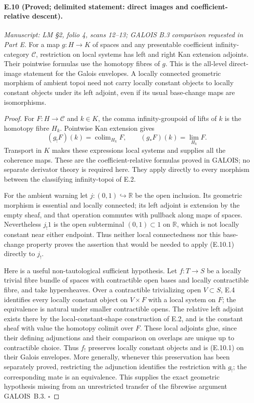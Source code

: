 \paragraph{E.10 (Proved; delimited statement: direct images and coefficient-relative descent).}
\textit{Manuscript: LM \S2, folio 4, scans 12--13; GALOIS B.3 comparison requested in Part E.}
For a map $g:H\to K$ of spaces and any presentable coefficient infinity-category $\mathcal C$, restriction on local systems has left and right Kan extension adjoints. Their pointwise formulas use the homotopy fibres of $g$. This is the all-level direct-image statement for the Galois envelopes. A locally connected geometric morphism of ambient topoi need not carry locally constant objects to locally constant objects under its left adjoint, even if its usual base-change maps are isomorphisms.
\begin{proof}
For $F:H\to\mathcal C$ and $k\in K$, the comma infinity-groupoid of lifts of $k$ is the homotopy fibre $H_k$. Pointwise Kan extension gives
\[
 (g_!F)(k)=\operatorname{colim}_{H_k}F,
 \qquad (g_*F)(k)=\lim_{H_k}F.
                                                        \tag{E.10.1}
\]
Transport in $K$ makes these expressions local systems and supplies all the coherence maps. These are the coefficient-relative formulas proved in GALOIS; no separate derivator theory is required here. They apply directly to every morphism between the classifying infinity-topoi of E.2.

For the ambient warning let $j:(0,1)\hookrightarrow\mathbb R$ be the open inclusion. Its geometric morphism is essential and locally connected; its left adjoint is extension by the empty sheaf, and that operation commutes with pullback along maps of spaces. Nevertheless $j_!1$ is the open subterminal $(0,1)\subset1$ on $\mathbb R$, which is not locally constant near either endpoint. Thus neither local connectedness nor this base-change property proves the assertion that would be needed to apply (E.10.1) directly to $j_!$.

Here is a useful non-tautological sufficient hypothesis. Let $f:T\to S$ be a locally trivial fibre bundle of spaces with contractible open bases and locally contractible fibre, and take hypersheaves. Over a contractible trivializing open $V\subset S$, E.4 identifies every locally constant object on $V\times F$ with a local system on $F$; the equivalence is natural under smaller contractible opens. The relative left adjoint exists there by the local-constant-shape construction of E.2, and is the constant sheaf with value the homotopy colimit over $F$. These local adjoints glue, since their defining adjunctions and their comparison on overlaps are unique up to contractible choice. Thus $f_!$ preserves locally constant objects and is (E.10.1) on their Galois envelopes. More generally, whenever this preservation has been separately proved, restricting the adjunction identifies the restriction with $g_!$; the corresponding mate is an equivalence. This supplies the exact geometric hypothesis missing from an unrestricted transfer of the fibrewise argument GALOIS~B.3. \hfill$\square$
\end{proof}

